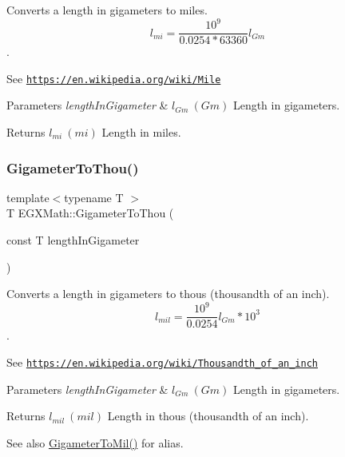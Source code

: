 Converts a length in gigameters to miles. \[ l_{mi}=\frac{10^{9}}{0.0254 * 63360} l_{Gm} \]. 

See \href{https://en.wikipedia.org/wiki/Mile}{\tt https\+://en.\+wikipedia.\+org/wiki/\+Mile} 
\begin{DoxyParams}{Parameters}
{\em length\+In\+Gigameter} & $ l_{Gm}\ (Gm)$ Length in gigameters. \\
\hline
\end{DoxyParams}
\begin{DoxyReturn}{Returns}
$ l_{mi}\ (mi)$ Length in miles. 
\end{DoxyReturn}
\mbox{\label{group___e_g_x_math-_conversions-_length_conversions-_gigameter-_imperial_ga94fd906264f882396dc438a684e22b41}} 
\subsubsection{\texorpdfstring{Gigameter\+To\+Thou()}{GigameterToThou()}}
{\footnotesize\ttfamily template$<$typename T $>$ \\
T E\+G\+X\+Math\+::\+Gigameter\+To\+Thou (\begin{DoxyParamCaption}\item[{const T}]{length\+In\+Gigameter }\end{DoxyParamCaption})}



Converts a length in gigameters to thous (thousandth of an inch). \[ l_{mil}= \frac{10^{9}}{0.0254} l_{Gm} * 10^{3} \]. 

See \href{https://en.wikipedia.org/wiki/Thousandth_of_an_inch}{\tt https\+://en.\+wikipedia.\+org/wiki/\+Thousandth\+\_\+of\+\_\+an\+\_\+inch} 
\begin{DoxyParams}{Parameters}
{\em length\+In\+Gigameter} & $ l_{Gm}\ (Gm)$ Length in gigameters. \\
\hline
\end{DoxyParams}
\begin{DoxyReturn}{Returns}
$ l_{mil}\ (mil)$ Length in thous (thousandth of an inch). 
\end{DoxyReturn}
\begin{DoxySeeAlso}{See also}
\mbox{\hyperlink{group___e_g_x_math-_conversions-_length_conversions-_gigameter-_imperial_ga498a43d44c0c0f6527362688d6cc361f}{Gigameter\+To\+Mil()}} for alias. 
\end{DoxySeeAlso}
\mbox{\label{group___e_g_x_math-_conversions-_length_conversions-_gigameter-_imperial_gadc687ba83985120ec09d825adace01d6}} 
